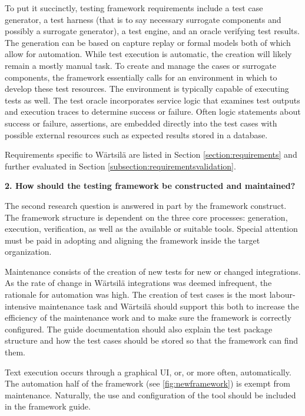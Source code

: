 \documentclass[12pt,a4paper,oneside,pdftex]{report}
\begin{document}
{To put it succinctly, testing framework requirements include a test case generator, a test harness (that is to say necessary surrogate components and possibly a surrogate generator), a test engine, and an oracle verifying test results. The generation can be based on capture replay or formal models both of which allow for automation. While test execution is automatic, the creation will likely remain a mostly manual task. To create and manage the cases or surrogate components, the framework essentially calls for an environment in which to develop these test resources. The environment is typically capable of executing tests as well. The test oracle incorporates service logic that examines test outputs and execution traces to determine success or failure. Often logic statements about success or failure, assertions, are embedded directly into the test cases with possible external resources such as expected results stored in a database. 

Requirements specific to Wärtsilä are listed in Section \ref{section:requirements} and further evaluated in Section \ref{subsection:requirementsvalidation}. \\

\begin{adjustwidth}{2.5em}{0pt}
\textbf{2. How should the testing framework be constructed and maintained?} \\
\end{adjustwidth}

The second research question is answered in part by the framework construct. The framework structure is dependent on the three core processes: generation, execution, verification, as well as the available or suitable tools. Special attention must be paid in adopting and aligning the framework inside the target organization.

Maintenance consists of the creation of new tests for new or changed integrations. As the rate of change in Wärtsilä integrations was deemed infrequent, the rationale for automation was high. The creation of test cases is the most labour-intensive maintenance task and Wärtsilä should support this both to increase the efficiency of the maintenance work and to make sure the framework is correctly configured. The guide documentation should also explain the test package structure and how the test cases should be stored so that the framework can find them.

Text execution occurs through a graphical UI, or, or more often, automatically. The automation half of the framework (see \ref{fig:newframework}) is exempt from maintenance. Naturally, the use and configuration of the tool should be included in the framework guide.

}
\end{document}
